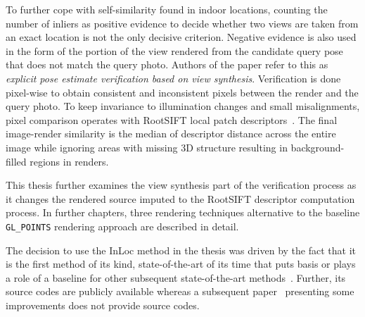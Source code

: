 To further cope with self-similarity found in indoor locations, counting the number of inliers
as positive evidence to decide whether two views are taken from an exact location is not the
only decisive criterion. Negative evidence is also used in the form of the portion of the view
rendered from the candidate query pose that does not match the query photo. Authors of the paper
refer to this as \emph{explicit pose estimate verification based on view synthesis}. Verification
is done pixel-wise to obtain consistent and inconsistent pixels between the render and the query photo.
To keep invariance to illumination changes and small misalignments, pixel comparison operates with RootSIFT
local patch descriptors~\citep{RootSIFT}. The final image-render similarity is the median of descriptor distance
across the entire image while ignoring areas with missing 3D structure resulting in background-filled regions in renders.

This thesis further examines the view synthesis part of the verification process as it changes the rendered source imputed
to the RootSIFT descriptor computation process. In further chapters, three rendering
techniques alternative to the baseline \verb|GL_POINTS| rendering approach are described in detail.

The decision to use the InLoc method in the thesis was driven by the fact that it is the first method of its kind,
state-of-the-art of its time that puts basis or plays a role of a baseline for
other subsequent state-of-the-art methods~\citep{PoseCorrection}. Further, its source codes are publicly
available whereas a subsequent paper~\citep{InLocRevisited}
presenting some improvements does not provide source codes.
